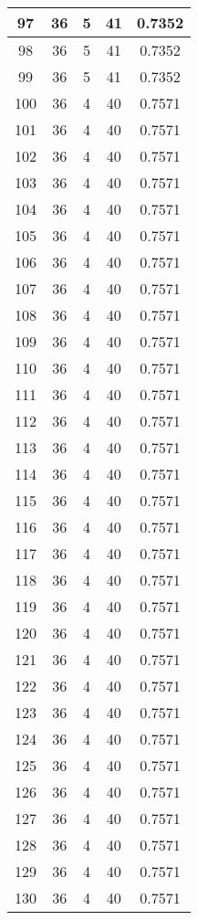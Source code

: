 \documentclass[letterpaper, 12pt]{article}
\begin{document}
\begin{longtable}{|c|c|c|c|c|}
\hline
97 & 36 & 5 & 41 & 0.7352 \\
\hline
98 & 36 & 5 & 41 & 0.7352 \\
\hline
99 & 36 & 5 & 41 & 0.7352 \\
\hline
100 & 36 & 4 & 40 & 0.7571 \\
\hline
101 & 36 & 4 & 40 & 0.7571 \\
\hline
102 & 36 & 4 & 40 & 0.7571 \\
\hline
103 & 36 & 4 & 40 & 0.7571 \\
\hline
104 & 36 & 4 & 40 & 0.7571 \\
\hline
105 & 36 & 4 & 40 & 0.7571 \\
\hline
106 & 36 & 4 & 40 & 0.7571 \\
\hline
107 & 36 & 4 & 40 & 0.7571 \\
\hline
108 & 36 & 4 & 40 & 0.7571 \\
\hline
109 & 36 & 4 & 40 & 0.7571 \\
\hline
110 & 36 & 4 & 40 & 0.7571 \\
\hline
111 & 36 & 4 & 40 & 0.7571 \\
\hline
112 & 36 & 4 & 40 & 0.7571 \\
\hline
113 & 36 & 4 & 40 & 0.7571 \\
\hline
114 & 36 & 4 & 40 & 0.7571 \\
\hline
115 & 36 & 4 & 40 & 0.7571 \\
\hline
116 & 36 & 4 & 40 & 0.7571 \\
\hline
117 & 36 & 4 & 40 & 0.7571 \\
\hline
118 & 36 & 4 & 40 & 0.7571 \\
\hline
119 & 36 & 4 & 40 & 0.7571 \\
\hline
120 & 36 & 4 & 40 & 0.7571 \\
\hline
121 & 36 & 4 & 40 & 0.7571 \\
\hline
122 & 36 & 4 & 40 & 0.7571 \\
\hline
123 & 36 & 4 & 40 & 0.7571 \\
\hline
124 & 36 & 4 & 40 & 0.7571 \\
\hline
125 & 36 & 4 & 40 & 0.7571 \\
\hline
126 & 36 & 4 & 40 & 0.7571 \\
\hline
127 & 36 & 4 & 40 & 0.7571 \\
\hline
128 & 36 & 4 & 40 & 0.7571 \\
\hline
129 & 36 & 4 & 40 & 0.7571 \\
\hline
130 & 36 & 4 & 40 & 0.7571 \\

\end{longtable}
\end{document}
